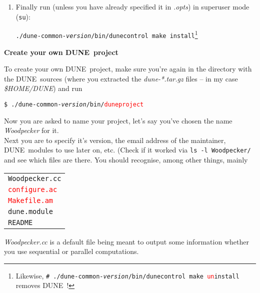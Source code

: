 \documentclass[a4paper,12pt]{article}
\newcommand{\dune}{\textsc{DUNE}\ }
\newcommand{\dyeitred}{\textcolor{red}}{}
\begin{document}
\begin{enumerate}
It seems also better to install
    \dune in some dir in your \texttt{\$HOME} dir
\item Finally run (unless you have already specified it in
  \textit{.opts}) in superuser mode (\texttt{su}):\begin{center}
     \texttt{./dune-common-\textit{version}/bin/dunecontrol make
       install}\footnote{Likewise, \texttt{\# ./dune-common-\textit{version}/bin/dunecontrol make
       \dyeitred{un}install} removes \dune!} 
 \end{center}
\end{enumerate}

\medskip
\begin{center}
 \large {\textbf{\textsf{Create your own \dune project}}}
\end{center}

To create your own \dune project, make sure you're again in the
directory with the \dune sources (where you extracted the
\textit{dune-*.tar.gz} files -- in my case \textit{\$HOME/DUNE}) and run
\begin{center}
  \texttt{\$ ./dune-common-\textit{version}/bin/\dyeitred{duneproject}}
\end{center}
Now you are asked to name your project, let's say you've chosen the name
\textit{Woodpecker} for it. \\ Next you are to specify it's version, the email address of the
maintainer, \dune modules to use later on, etc. (Check if it worked via \texttt{ls
  -l Woodpecker/ } and see which files are there. You should recognise, among
other things, mainly 
   \begin{center}
     \begin{tabular}{l} 
     \texttt{Woodpecker.cc}\\
  \texttt{\dyeitred{configure.ac}}\\
  \texttt{\dyeitred{Makefile.am}} \\
  \texttt{dune.module}\\
  \texttt{README}
    \end{tabular}
     \end{center}
\textit{Woodpecker.cc} is a default file being meant to output some
information whether you use sequential or parallel computations.\\
\end{document}
